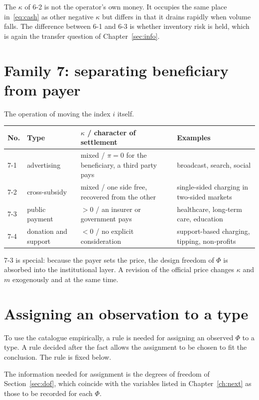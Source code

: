 The $\kappa$ of 6-2 is not the operator's own money. It occupies the same place
in~\eqref{eq:cash} as other negative $\kappa$ but differs in that it drains rapidly when
volume falls. The difference between 6-1 and 6-3 is whether inventory risk is held, which is
again the transfer question of Chapter~\ref{sec:info}.

\section{Family 7: separating beneficiary from payer}

The operation of moving the index $i$ itself.

\begin{center}
\begin{tabularx}{\textwidth}{@{}llXX@{}}
\toprule
No. & Type & $\kappa$ / character of settlement & Examples \\
\midrule
7-1 & advertising & mixed / $\pi=0$ for the beneficiary, a third party pays & broadcast, search, social \\
7-2 & cross-subsidy & mixed / one side free, recovered from the other & single-sided charging in two-sided markets \\
7-3 & public payment & $>0$ / an insurer or government pays & healthcare, long-term care, education \\
7-4 & donation and support & $<0$ / no explicit consideration & support-based charging, tipping, non-profits \\
\bottomrule
\end{tabularx}
\label{tab:family-7-catalog}
\end{center}

7-3 is special: because the payer sets the price, the design freedom of $\Phi$ is absorbed
into the institutional layer. A revision of the official price changes $\kappa$ and $m$
exogenously and at the same time.

\section{Assigning an observation to a type}
\label{sec:type-assignment}

To use the catalogue empirically, a rule is needed for assigning an observed $\Phi$ to a
type. A rule decided after the fact allows the assignment to be chosen to fit the
conclusion. The rule is fixed below.

The information needed for assignment is the degrees of freedom of Section~\ref{sec:dof},
which coincide with the variables listed in Chapter~\ref{ch:next} as those to be recorded
for each $\Phi$.

